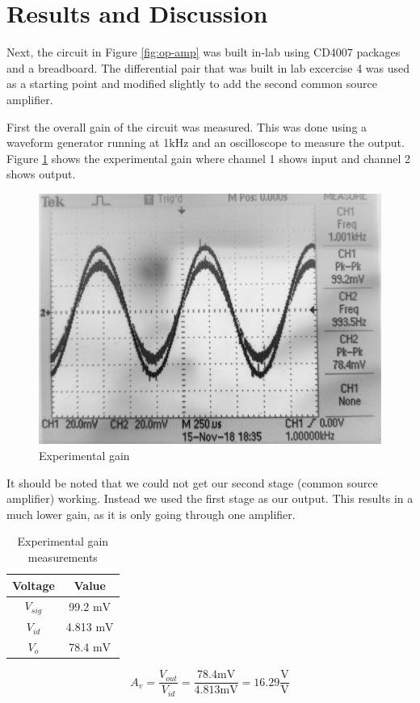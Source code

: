\documentclass[11pt]{article}
\begin{document}
	\section{Results and Discussion}
	Next, the circuit in Figure \ref{fig:op-amp} was built in-lab using CD4007
	packages and a breadboard. The differential pair that was built in lab excercise 4
	was used as a starting point and modified slightly to add the second common source
	amplifier.\\
	\hfill\break

	First the overall gain of the circuit was measured. This was done using a waveform generator
	running at 1$\si{\kilo\hertz}$ and an oscilloscope to measure the output.
	Figure \ref{fig:experimental_gain} shows the experimental gain where channel 1 shows input and 
	channel 2 shows output.

	\begin{figure}[H]
		\includegraphics[width=\textwidth]{experimental_gain.jpg}
		\caption{Experimental gain}
		\label{fig:experimental_gain}
	\end{figure}

	It should be noted that we could not get our second stage (common source amplifier)
	working. Instead we used the first stage as our output. This results in a much lower
	gain, as it is only going through one amplifier. \\
	\hfill\break
	
	\begin{table}[H]
		\centering
		\caption{Experimental gain measurements}
		\label{table:exp_gain}
		\begin{tabular}{|c|c|}
			\hline
			\textbf{Voltage} & \textbf{Value}\\
			\hline
			$V_{sig}$ & 99.2 $\si{\milli\volt}$\\
			$V_{id}$ & 4.813 $\si{\milli\volt}$\\
			$V_o$ & 78.4 $\si{\milli\volt}$\\
			\hline
		\end{tabular}
	\end{table}
	\begin{equation}
		A_v = \frac{V_{out}}{V_{id}} = \frac{78.4\si{\milli\volt}}{4.813\si{\milli\volt}} = 16.29 \frac{\si\volt}{\si\volt}
	\end{equation}
\end{document}

